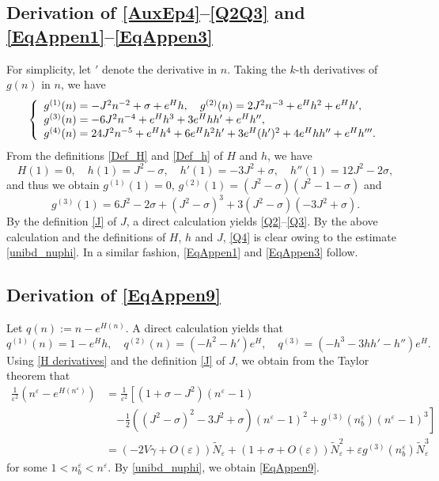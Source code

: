 \documentclass{amsart}
\newcommand{\veps}{\varepsilon}
\numberwithin{equation}{section}
\theoremstyle{plain}%
\theoremstyle{definition}
\theoremstyle{remark}
\theoremstyle{remark}
\begin{document}
\subsection{Derivation of \eqref{AuxEp4}--\eqref{Q2Q3} and \eqref{EqAppen1}--\eqref{EqAppen3}} For simplicity, let $'$ denote the derivative in $n$. Taking the $k$-th derivatives of $g(n)$ in $n$, we have
\[
\left\{
\begin{array}{l l}
g^{(1)}(n) = -J^2n^{-2} + \sigma + e^{H}h , \quad g^{(2)}(n) = 2J^2n^{-3} + e^{H}h^2 + e^{H}h', \\
g^{(3)}(n) = -6J^2n^{-4} + e^{H}h^3 + 3e^{H}hh' + e^{H}h'', \\
g^{(4)}(n) = 24J^2n^{-5} + e^{H}h^4 + 6e^{H}h^2h' + 3e^{H}(h')^2   + 4e^{H}hh''+e^{H}h'''.
\end{array} 
\right.
\]
From the definitions \eqref{Def_H} and \eqref{Def_h} of $H$ and $h$, we have 
\begin{equation}\label{H derivatives}
H(1)=0, \quad h(1)=J^2-\sigma, \quad h'(1)=-3J^2+\sigma, \quad h''(1)=12J^2-2\sigma,
\end{equation}
and thus we obtain $g^{(1)}(1)=0$, $g^{(2)}(1) =  (J^2-\sigma)(J^2-1-\sigma)$ and
\[
g^{(3)}(1) = 6J^2-2\sigma + (J^2-\sigma)^3 + 3(J^2-\sigma)(-3J^2+\sigma).
\]
By the definition \eqref{J} of $J$, a direct calculation yields \eqref{Q2}--\eqref{Q3}. By the above calculation and the definitions of $H$, $h$ and $J$, \eqref{Q4} is clear owing to the estimate \eqref{unibd_nuphi}. In a similar fashion, \eqref{EqAppen1} and \eqref{EqAppen3} follow.

\subsection{Derivation of \eqref{EqAppen9}} Let $q(n):= n-e^{H(n)}$. A direct calculation yields that
\[
q^{(1)}(n)=1-e^{H}h, \quad q^{(2)}(n)=(-h^2 -  h')e^H, \quad q^{(3)}=(-h^3-3hh'-h'')e^H.
\] 
Using \eqref{H derivatives} and the definition \eqref{J} of $J$, we obtain from the Taylor theorem that
\begin{equation}\label{Ap44}
\begin{split}
\frac{1}{\veps^2}(n^\veps-e^{H(n^\veps)}) 
& = \frac{1}{\veps^2}\left[ (1+\sigma-J^2)(n^\veps-1) \right. \\
& \quad \left. - \frac{1}{2}((J^2-\sigma)^2-3J^2+\sigma)(n^\veps-1)^2   + g^{(3)}(n_b^\veps)(n^\veps-1)^3 \right]\\
& = \left( -2V\gamma + O(\veps) \right)\widetilde{N}_\veps  +\left( 1+\sigma +O(\veps)\right)\widetilde{N}_\veps^2 +\veps g^{(3)}(n_b^\veps)\widetilde{N}_\veps^3
\end{split}
\end{equation}
for some $1<n_b^\veps<n^\veps$. By \eqref{unibd_nuphi}, we obtain \eqref{EqAppen9}.
\end{document}
